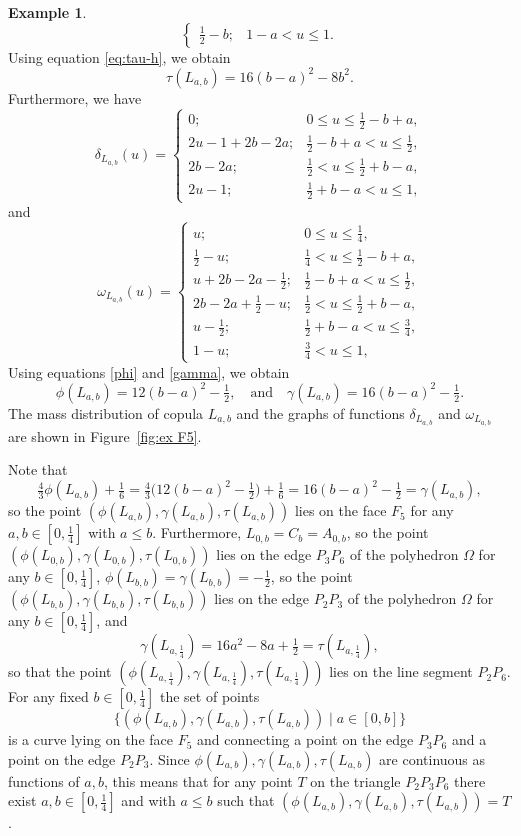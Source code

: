 \documentclass[12pt,a4paper]{amsart}
\theoremstyle{definition}
\newtheorem{example}[theorem]{Example}
\begin{document}
\begin{example}
$$\begin{cases}
            \tfrac12 - b; &  1-a < u \le 1.
            \end{cases}
$$
Using equation \eqref{eq:tau-h}, we obtain
$$  \tau(L_{a,b}) = 16(b-a)^2 - 8b^2. $$
Furthermore, we have
$$ \delta_{L_{a,b}}(u) =  \begin{cases}
            0; &  0 \le u \le \tfrac12-b+a, \\
            2u - 1 + 2b - 2a; &  \tfrac12-b+a < u \le \tfrac12, \\
            2b - 2a; &  \tfrac12 < u \le \tfrac12+b-a, \\
            2u-1; &  \tfrac12+b-a < u \le 1, 
            \end{cases}
$$
and
$$ \omega_{L_{a,b}}(u) =  \begin{cases}
            u; &  0 \le u \le \tfrac14, \\
            \tfrac12 - u; &  \tfrac14 < u \le \tfrac12 - b + a, \\     
            u + 2b - 2a - \tfrac12; &  \tfrac12 - b + a < u \le \tfrac12, \\
            2b - 2a + \tfrac12 - u; &  \tfrac12 < u \le \tfrac12 + b - a, \\
            u - \tfrac12; &  \tfrac12 + b - a < u \le \tfrac34, \\
            1-u; &  \tfrac34 < u \le 1, 
            \end{cases}
$$
Using equations \eqref{phi}  and \eqref{gamma}, we obtain
$$  \phi(L_{a,b}) = 12(b-a)^2-\tfrac12, \quad \text{and} \quad \gamma(L_{a,b}) = 16(b-a)^2-\tfrac12. $$
The mass distribution of copula $L_{a,b}$ and the graphs of functions $\delta_{L_{a,b}}$ and $\omega_{L_{a,b}}$ are shown in Figure~\ref{fig:ex F5}.

Note that 
$$\tfrac43\phi(L_{a,b})+\tfrac16 = \tfrac43\big(12(b-a)^2-\tfrac12\big)+\tfrac16  
  = 16(b-a)^2-\tfrac12 = \gamma(L_{a,b}),$$
so the point $(\phi(L_{a,b}), \gamma(L_{a,b}), \tau(L_{a,b}))$ lies on the face $F_5$ for any $a, b\in [0, \tfrac14]$ with $a \le b$.
Furthermore, $L_{0,b} = C_b = A_{0,b}$,
so the point $(\phi(L_{0,b}), \gamma(L_{0,b}), \tau(L_{0,b}))$ lies on the edge $P_3P_6$ of the polyhedron $\Omega$ for any $b\in [0, \tfrac14]$, $\phi(L_{b,b}) = \gamma(L_{b,b}) = -\tfrac12$, so the point $(\phi(L_{b,b}), \gamma(L_{b,b}), \tau(L_{b,b}))$ lies on the edge $P_2P_3$ of the polyhedron $\Omega$ for any $b\in [0, \tfrac14]$, and
$$  \gamma(L_{a,\frac14}) = 16a^2-8a+\tfrac12 = \tau(L_{a,\frac14}),$$
so that the point $(\phi(L_{a,\frac14}), \gamma(L_{a,\frac14}), \tau(L_{a,\frac14}))$ lies on the line segment $P_2P_6$. For any fixed $b\in [0, \tfrac14]$ the set of points 
$$\big\{(\phi(L_{a,b}), \gamma(L_{a,b}), \tau(L_{a,b})) \mid a\in [0, b]\big\}$$ 
is a curve lying on the face $F_5$ and connecting a point on the edge $P_3P_6$ and a point on the edge $P_2P_3$. Since $\phi(L_{a,b}), \gamma(L_{a,b}), \tau(L_{a,b})$ are continuous as functions of $a,b$, this means that for any point $T$ on the triangle $P_2 P_3 P_6$ there exist $a, b \in [0, \tfrac14]$ and with $a \le b$ such that $(\phi(L_{a,b}), \gamma(L_{a,b}), \tau(L_{a,b})) = T$.


\end{example}
\end{document}

